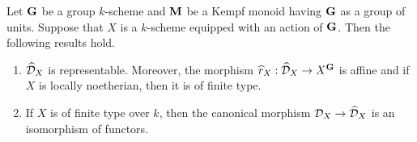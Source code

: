 \begin{theorem}\label{theorem:representability_of_bb_functors}
Let $\mathbf{G}$ be a group $k$-scheme and $\mathbf{M}$ be a Kempf monoid having $\mathbf{G}$ as a group of units. Suppose that $X$ is a $k$-scheme equipped with an action of $\mathbf{G}$. Then the following results hold.
\begin{enumerate}[label=\emph{\textbf{(\arabic*)}}, leftmargin=3.0em]
\item $\widehat{{\mathcal D}}_X$ is representable. Moreover, the morphism $\widehat{r}_X:\widehat{{\mathcal D}}_X\rightarrow X^{\mathbf{G}}$ is affine and if $X$ is locally noetherian, then it is of finite type.
\item If $X$ is of finite type over $k$, then the canonical morphism ${\mathcal D}_X\rightarrow \widehat{{\mathcal D}}_X$ is an isomorphism of functors.
\end{enumerate}
\end{theorem}
